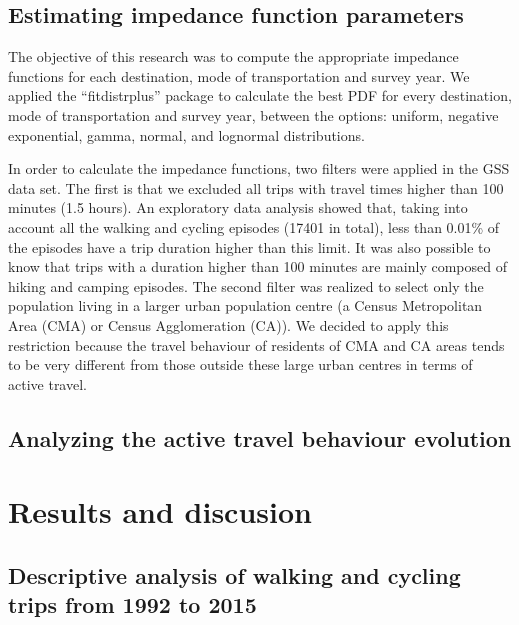 \documentclass[preprint, 3p,
authoryear]{elsarticle} %
\begin{document}
\hypertarget{estimating-impedance-function-parameters}{%
\subsection{Estimating impedance function
parameters}\label{estimating-impedance-function-parameters}}

The objective of this research was to compute the appropriate impedance
functions for each destination, mode of transportation and survey year.
We applied the ``fitdistrplus'' package to calculate the best PDF for
every destination, mode of transportation and survey year, between the
options: uniform, negative exponential, gamma, normal, and lognormal
distributions.

In order to calculate the impedance functions, two filters were applied
in the GSS data set. The first is that we excluded all trips with travel
times higher than 100 minutes (1.5 hours). An exploratory data analysis
showed that, taking into account all the walking and cycling episodes
(17401 in total), less than 0.01\% of the episodes have a trip duration
higher than this limit. It was also possible to know that trips with a
duration higher than 100 minutes are mainly composed of hiking and
camping episodes. The second filter was realized to select only the
population living in a larger urban population centre (a Census
Metropolitan Area (CMA) or Census Agglomeration (CA)). We decided to
apply this restriction because the travel behaviour of residents of CMA
and CA areas tends to be very different from those outside these large
urban centres in terms of active travel.

\hypertarget{analyzing-the-active-travel-behaviour-evolution}{%
\subsection{Analyzing the active travel behaviour
evolution}\label{analyzing-the-active-travel-behaviour-evolution}}

\hypertarget{results-and-discusion}{%
\section{Results and discusion}\label{results-and-discusion}}

\hypertarget{descriptive-analysis-of-walking-and-cycling-trips-from-1992-to-2015}{%
\subsection{Descriptive analysis of walking and cycling trips from 1992
to
2015}\label{descriptive-analysis-of-walking-and-cycling-trips-from-1992-to-2015}}
\end{document}

